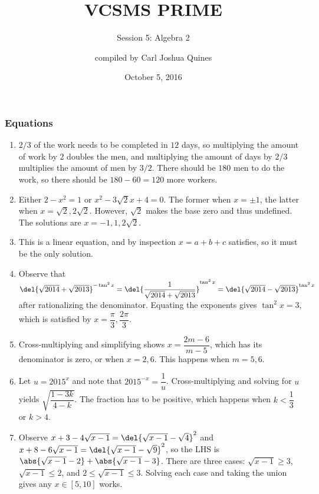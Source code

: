 \documentclass[10pt,paper=letter]{scrartcl}
\begin{document}
\title{VCSMS PRIME}
\subtitle{Session 5: Algebra 2}
\author{compiled by Carl Joshua Quines}
\date{October 5, 2016}

\maketitle

\subsubsection*{Equations}

\begin{enumerate}

\item $2/3$ of the work needs to be completed in $12$ days, so multiplying the amount of work by $2$ doubles the men, and multiplying the amount of days by $2/3$ multiplies the amount of men by $3/2$. There should be $180$ men to do the work, so there should be $180 - 60 = 120$ more workers.

\item Either $2 - x^2 = 1$ or $x^2 - 3\sqrt2x + 4 = 0$. The former when $x = \pm1$, the latter when $x = \sqrt2, 2\sqrt2$. However, $\sqrt2$ makes the base zero and thus undefined. The solutions are $x = -1, 1, 2\sqrt2$.

\item This is a linear equation, and by inspection $x = a + b + c$ satisfies, so it must be the only solution.

\item Observe that $\del{\sqrt{2014} + \sqrt{2013}}^{-\tan^2 x} = \del{\dfrac1{\sqrt{2014} + \sqrt{2013}}}^{\tan^2 x} = \del{\sqrt{2014} - \sqrt{2013}}^{\tan^2 x}$ after rationalizing the denominator. Equating the exponents gives $\tan^2 x = 3$, which is satisfied by $x = \dfrac\pi3, \dfrac{2\pi}3$.

\item Cross-multiplying and simplifying shows $x = \dfrac{2m-6}{m-5}$, which has its denominator is zero, or when $x = 2, 6$. This happens when $m = 5, 6$.

\item Let $u = 2015^x$ and note that $2015^{-x} = \dfrac1u$. Cross-multiplying and solving for $u$ yields $\sqrt{\dfrac{1-3k}{4-k}}$. The fraction has to be positive, which happens when $k < \dfrac13$ or $k > 4$.

\item Observe $x + 3 - 4\sqrt{x-1} = \del{\sqrt{x-1} - \sqrt4}^2$ and $x + 8 - 6\sqrt{x-1} = \del{\sqrt{x-1} - \sqrt9}^2$, so the LHS is $\abs{\sqrt{x-1} - 2} + \abs{\sqrt{x-1} - 3}$. There are three cases: $\sqrt{x-1} \geq 3$, $\sqrt{x-1} \leq 2$, and $2 \leq \sqrt{x-1} \leq 3$. Solving each case and taking the union gives any $x \in [5, 10]$ works.


\end{enumerate}
\end{document}
